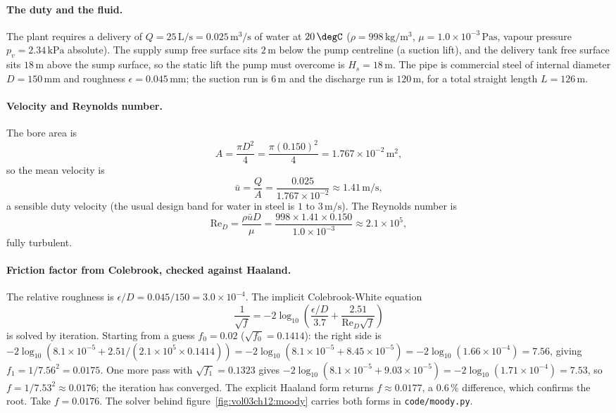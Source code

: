\paragraph{The duty and the fluid.} The plant requires a delivery of
$Q = 25\,\si{\liter\per\second} = 0.025\,\si{\meter\cubed\per\second}$
of water at $20\,\degC$ ($\rho = 998\,\si{\kilogram\per\meter\cubed}$,
$\mu = 1.0\times10^{-3}\,\si{\pascal\second}$, vapour pressure
$p_v = 2.34\,\si{\kilo\pascal}$ absolute). The supply sump free
surface sits $2\,\si{\meter}$ below the pump centreline (a suction
lift), and the delivery tank free surface sits $18\,\si{\meter}$
above the sump surface, so the static lift the pump must overcome is
$H_s = 18\,\si{\meter}$. The pipe is commercial steel of internal
diameter $D = 150\,\si{\milli\meter}$ and roughness $\epsilon =
0.045\,\si{\milli\meter}$; the suction run is $6\,\si{\meter}$ and the
discharge run is $120\,\si{\meter}$, for a total straight length
$L = 126\,\si{\meter}$.

\paragraph{Velocity and Reynolds number.} The bore area is
\[
A = \frac{\pi D^2}{4} = \frac{\pi (0.150)^2}{4} = 1.767\times10^{-2}
\,\si{\meter\squared},
\]
so the mean velocity is
\[
\bar u = \frac{Q}{A} = \frac{0.025}{1.767\times10^{-2}} \approx
1.41\,\si{\meter\per\second},
\]
a sensible duty velocity (the usual design band for water in steel is
$1$ to $3\,\si{\meter\per\second}$). The Reynolds number is
\[
\text{Re}_D = \frac{\rho\bar u D}{\mu} = \frac{998\times1.41\times
0.150}{1.0\times10^{-3}} \approx 2.1\times10^{5},
\]
fully turbulent.

\paragraph{Friction factor from Colebrook, checked against Haaland.}
The relative roughness is $\epsilon/D = 0.045/150 = 3.0\times10^{-4}$.
The implicit Colebrook-White equation
\[
\frac{1}{\sqrt f} = -2\log_{10}\!\left(\frac{\epsilon/D}{3.7} +
\frac{2.51}{\text{Re}_D\sqrt f}\right)
\]
is solved by iteration. Starting from a guess $f_0 = 0.02$
($\sqrt{f_0}=0.1414$): the right side is $-2\log_{10}(8.1\times10^{-5}
+ 2.51/(2.1\times10^5\times0.1414)) = -2\log_{10}(8.1\times10^{-5} +
8.45\times10^{-5}) = -2\log_{10}(1.66\times10^{-4}) = 7.56$, giving
$f_1 = 1/7.56^2 = 0.0175$. One more pass with $\sqrt{f_1}=0.1323$
gives $-2\log_{10}(8.1\times10^{-5} + 9.03\times10^{-5}) =
-2\log_{10}(1.71\times10^{-4}) = 7.53$, so $f = 1/7.53^2 \approx
0.0176$; the iteration has converged. The explicit Haaland form
returns $f\approx0.0177$, a $0.6\,\%$ difference, which confirms the
root. Take $f = 0.0176$. The solver behind
figure~\ref{fig:vol03ch12:moody} carries both forms in
\texttt{code/moody.py}.

